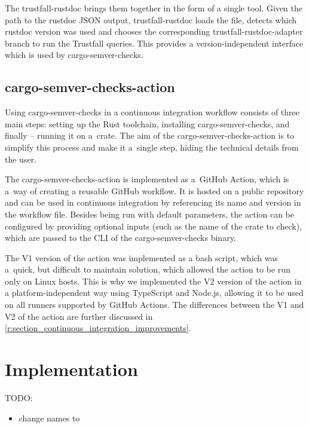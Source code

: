 \documentclass[licencjacka,en]{pracamgr}
\begin{document}
The trustfall-rustdoc brings them together in the form of a single tool. Given the path to
the rustdoc JSON output, trustfall-rustdoc loads the file, detects which rustdoc version was used
and chooses the corresponding trustfall-rustdoc-adapter branch to run the Trustfall queries.
This provides a version-independent interface which is used by cargo-semver-checks.

\section{cargo-semver-checks-action}

Using cargo-semver-checks in a continuous integration workflow consists of three main steps:
setting up the Rust toolchain, installing cargo-semver-checks, and finally -- running it on a~crate.
The aim of the cargo-semver-checks-action is to simplify this process and make it a~single step,
hiding the technical details from the user.

The cargo-semver-checks-action is implemented as a~GitHub Action, which is a~way of creating
a reusable GitHub workflow. It is hosted on a public repository and can be used in continuous
integration by referencing its name and version in the workflow file. Besides being run with default
parameters, the action can be configured by providing optional inputs (such as the name of the crate
to check), which are passed to the CLI of the cargo-semver-checks binary.

The V1 version of the action was implemented as a bash script, which was a~quick, but difficult
to maintain solution, which allowed the action to be run only on Linux hosts. This is why
we implemented the V2 version of the action in a platform-independent way using TypeScript
and Node.js, allowing it to be used on all runners supported by GitHub Actions.
The differences between the V1 and V2 of the action are further discussed in
\ref{r:section_continuous_integration_improvements}.


\chapter{Implementation}\label{r:chapter_implementation}

TODO:
\begin{itemize}
	\item change names to 
\end{itemize}
\end{document}

